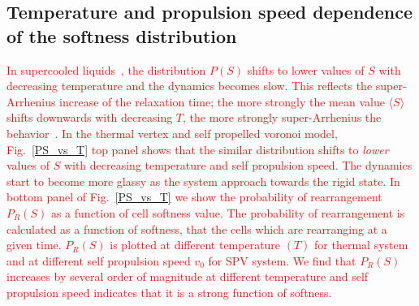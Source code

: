 \documentclass[twoside,twocolumn,9pt]{article}
\begin{document}
\subsection{Temperature and propulsion speed dependence of the softness distribution}
\textcolor{red}{
In supercooled liquids~\cite{schoenholz2016a,landes2019,cubuk2019}, the distribution $P(S)$ shifts to lower values of $S$ with decreasing temperature and the dynamics becomes slow. This reflects the super-Arrhenius increase of the relaxation time; the more strongly the mean value $\langle S \rangle$ shifts downwards with decreasing $T$, the more strongly super-Arrhenius the behavior~\cite{schoenholz2016b}. 
In the thermal vertex and self propelled voronoi model, Fig.~\ref{PS_vs_T} top panel shows that the similar distribution shifts to \emph{lower} values of $S$ with decreasing  temperature and self propulsion speed. The dynamics start to become more glassy as the system approach towards the rigid state. In bottom panel of
Fig.~\ref{PS_vs_T} we show the probability of rearrangement $P_R(S)$ as a function of cell softness value. The 
probability of rearrangement is calculated as a function of softness, that the cells which are rearranging at a given time.  $P_R(S)$ is plotted at different temperature $(T)$ for thermal system and at different self propulsion speed $v_0$ for SPV system. We find that $P_R(S)$ increases by several order of magnitude at different temperature and self propulsion speed indicates that it is a strong function of softness.}

\end{document}
